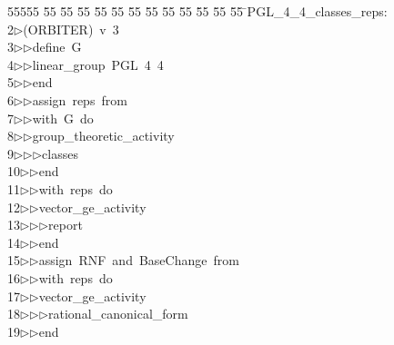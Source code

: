 %
%
\begin{tabbing}
55555 \= 55 \= 55 \= 55 \= 55 \= 55 \= 55 \= 55 \= 55 \= 55 \= 55 \= 55 \= 55 \= \>PGL\_4\_4\_classes\_reps:\\[0pt]
2\>$\triangleright$\>(ORBITER)\ v\ 3\ \\[0pt]
3\>$\triangleright$\>$\triangleright$\>define\ G\ \\[0pt]
4\>$\triangleright$\>$\triangleright$\>linear\_group\ PGL\ 4\ 4\ \\[0pt]
5\>$\triangleright$\>$\triangleright$\>end\ \\[0pt]
6\>$\triangleright$\>$\triangleright$\>assign\ reps\ from\ \\[0pt]
7\>$\triangleright$\>$\triangleright$\>with\ G\ do\ \\[0pt]
8\>$\triangleright$\>$\triangleright$\>group\_theoretic\_activity\ \\[0pt]
9\>$\triangleright$\>$\triangleright$\>$\triangleright$\>classes\ \\[0pt]
10\>$\triangleright$\>$\triangleright$\>end\ \\[0pt]
11\>$\triangleright$\>$\triangleright$\>with\ reps\ do\ \\[0pt]
12\>$\triangleright$\>$\triangleright$\>vector\_ge\_activity\ \\[0pt]
13\>$\triangleright$\>$\triangleright$\>$\triangleright$\>report\ \\[0pt]
14\>$\triangleright$\>$\triangleright$\>end\ \\[0pt]
15\>$\triangleright$\>$\triangleright$\>assign\ RNF\ and\ BaseChange\ from\ \\[0pt]
16\>$\triangleright$\>$\triangleright$\>with\ reps\ do\ \\[0pt]
17\>$\triangleright$\>$\triangleright$\>vector\_ge\_activity\ \\[0pt]
18\>$\triangleright$\>$\triangleright$\>$\triangleright$\>rational\_canonical\_form\ \\[0pt]
19\>$\triangleright$\>$\triangleright$\>end\ \\[0pt]

\end{tabbing}
